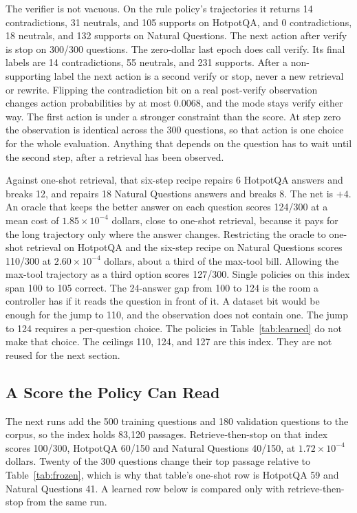 \documentclass[letterpaper]{article} %
\begin{document}
The verifier is not vacuous. On the rule policy's trajectories it returns 14 contradictions, 31 neutrals, and 105 supports on HotpotQA, and 0 contradictions, 18 neutrals, and 132 supports on Natural Questions. The next action after verify is stop on 300/300 questions. The zero-dollar last epoch does call verify. Its final labels are 14 contradictions, 55 neutrals, and 231 supports. After a non-supporting label the next action is a second verify or stop, never a new retrieval or rewrite. Flipping the contradiction bit on a real post-verify observation changes action probabilities by at most 0.0068, and the mode stays verify either way. The first action is under a stronger constraint than the score. At step zero the observation is identical across the 300 questions, so that action is one choice for the whole evaluation. Anything that depends on the question has to wait until the second step, after a retrieval has been observed.

Against one-shot retrieval, that six-step recipe repairs 6 HotpotQA answers and breaks 12, and repairs 18 Natural Questions answers and breaks 8. The net is \(+4\). An oracle that keeps the better answer on each question scores 124/300 at a mean cost of \(1.85\times 10^{-4}\) dollars, close to one-shot retrieval, because it pays for the long trajectory only where the answer changes. Restricting the oracle to one-shot retrieval on HotpotQA and the six-step recipe on Natural Questions scores 110/300 at \(2.60\times 10^{-4}\) dollars, about a third of the max-tool bill. Allowing the max-tool trajectory as a third option scores 127/300. Single policies on this index span 100 to 105 correct. The 24-answer gap from 100 to 124 is the room a controller has if it reads the question in front of it. A dataset bit would be enough for the jump to 110, and the observation does not contain one. The jump to 124 requires a per-question choice. The policies in Table~\ref{tab:learned} do not make that choice. The ceilings 110, 124, and 127 are this index. They are not reused for the next section.

\subsection{A Score the Policy Can Read}
The next runs add the 500 training questions and 180 validation questions to the corpus, so the index holds 83{,}120 passages. Retrieve-then-stop on that index scores 100/300, HotpotQA 60/150 and Natural Questions 40/150, at \(1.72\times 10^{-4}\) dollars. Twenty of the 300 questions change their top passage relative to Table~\ref{tab:frozen}, which is why that table's one-shot row is HotpotQA 59 and Natural Questions 41. A learned row below is compared only with retrieve-then-stop from the same run.
\end{document}
